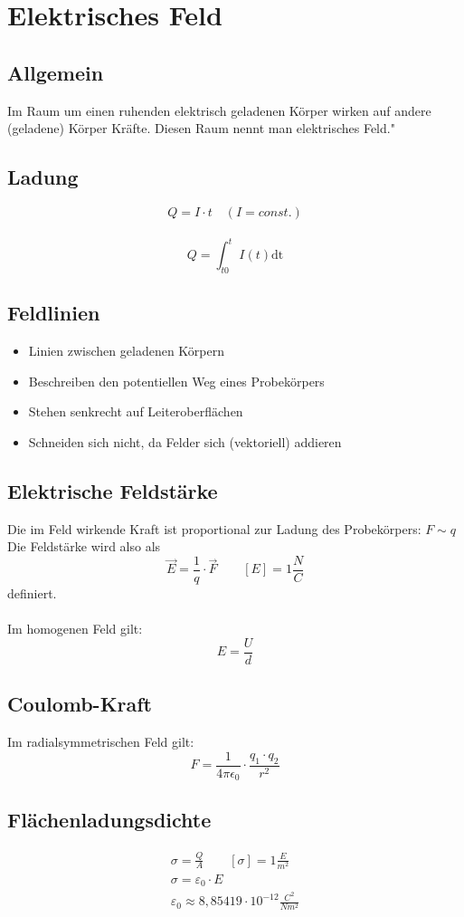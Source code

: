 \documentclass[12pt,a4paper,titlepage]{article}
\begin{document}
	\section{Elektrisches Feld}
		\subsection{Allgemein}
			\glqq Im Raum um einen ruhenden elektrisch geladenen Körper wirken auf andere (geladene) Körper Kräfte. Diesen Raum nennt man elektrisches Feld."
		\subsection{Ladung}
			$$Q = I \cdot t \quad (I = const.)$$ \\
			$$Q = \int_{t0}^t I(t) \mathrm{d}\mathrm{t}$$ 
		\subsection{Feldlinien}
			\begin{itemize}
				\item Linien zwischen geladenen Körpern
				\item Beschreiben den potentiellen Weg eines Probekörpers
				\item Stehen senkrecht auf Leiteroberflächen
				\item Schneiden sich nicht, da Felder sich (vektoriell) addieren
			\end{itemize}
		\subsection{Elektrische Feldstärke}
			Die im Feld wirkende Kraft ist proportional zur Ladung des Probekörpers: 	
			$F \sim q$\\
			Die Feldstärke wird also als
			$$\vec{E} = \frac{1}{q} \cdot \vec{F} \qquad [E] = 1 \frac{N}{C}$$
			definiert. \\ \\
			Im homogenen Feld gilt: \\
			$$E = \frac{U}{d}$$
		\subsection{Coulomb-Kraft}
			Im radialsymmetrischen Feld gilt:
			$$F = \frac{1}{4 \pi \epsilon_0} \cdot \frac{q_1 \cdot q_2}{r^2}$$
		\subsection{Flächenladungsdichte}
			\begin{gather*}
				\sigma = \frac{Q}{A} \qquad [\sigma] = 1 \frac{E}{m^2} \\
				\sigma = \varepsilon_0 \cdot E \\
				\varepsilon_0 \approx 8,85419 \cdot 10^{-12} \frac{C^2}{Nm^2}
			\end{gather*}
\end{document}
